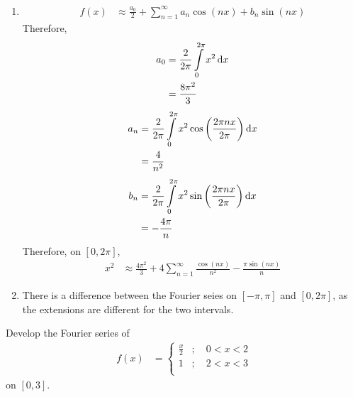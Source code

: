 \documentclass[fleqn, a4paper, 11pt, oneside]{amsart}
\theoremstyle{definition}
\theoremstyle{theorem}
\begin{document}
\begin{solution}
	\begin{enumerate}[leftmargin=*]
		\item
			\begin{align*}
				f(x) &\approx \frac{a_0}{2} + \sum\limits_{n = 1}^{\infty} a_n \cos(n x) + b_n \sin(n x)
			\end{align*}
			Therefore,
			\begin{align*}
				a_0 &= \frac{2}{2 \pi} \int\limits_{0}^{2 \pi} x^2 \dif x\\
				&= \frac{8 \pi^2}{3}
			\end{align*}
			\begin{align*}
				a_n &= \frac{2}{2 \pi} \int\limits_{0}^{2 \pi} x^2 \cos\left( \frac{2 \pi n x}{2 \pi} \right) \dif x\\
				&= \frac{4}{n^2}
			\end{align*}
			\begin{align*}
				b_n &= \frac{2}{2 \pi} \int\limits_{0}^{2 \pi} x^2 \sin\left( \frac{2 \pi n x}{2 \pi} \right) \dif x\\
				&= -\frac{4 \pi}{n}
			\end{align*}
			Therefore, on $[0,2 \pi]$,
			\begin{align*}
				x^2 &\approx \frac{4 \pi^2}{3} + 4 \sum\limits_{n = 1}^{\infty} \frac{\cos(n x)}{n^2} - \frac{\pi \sin(n x)}{n}
			\end{align*}
		\item
			There is a difference between the Fourier seies on $[-\pi,\pi]$ and $[0,2 \pi]$, as the extensions are different for the two intervals.
	\end{enumerate}
\end{solution}

\begin{question}
	Develop the Fourier series of
	\begin{align*}
		f(x) &=
			\begin{cases}
				\frac{x}{2} &;\quad 0 < x < 2\\
				1 &;\quad 2 < x < 3\\
			\end{cases}
	\end{align*}
	on $[0,3]$.
\end{question}
\end{document}

